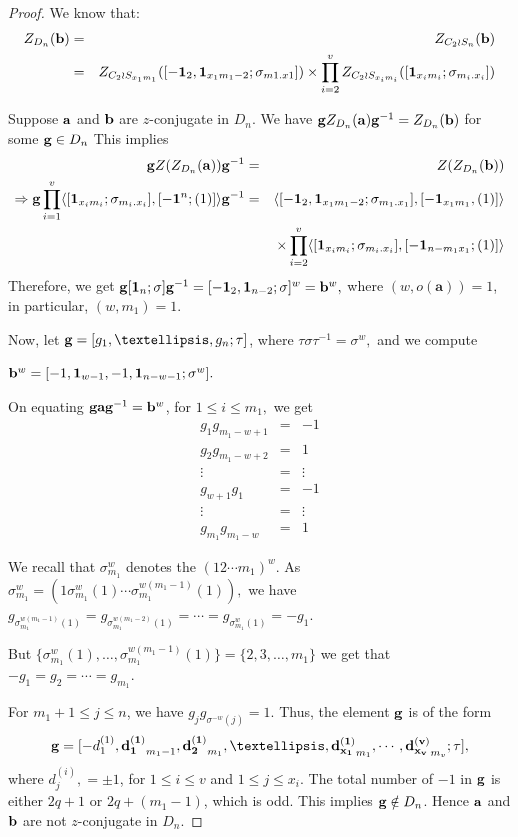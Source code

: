\documentclass[10pt,a4paper]{amsart}
\newcommand{\bmf}[1]{\mathbf{#1}}
\begin{document}
\begin{proof}
We know that: 
\begin{eqnarray*}
 {Z}_{D_n}({\bf b}) &=& {Z}_{C_2 \wr S_n}({\bf b}) \\
&=&{Z}_{C_2\wr S_{x_1m_1}}([{\bf -1}_2,{\bf 1}_{x_1m_1-2}; \sigma_{m1.x1}]) \times \prod_{i = 2}^v {Z}_{C_2 \wr S_{x_im_i}}([{\bf 1}_{x_im_i}; \sigma_{m_i.x_i}])
\end{eqnarray*}

Suppose ${\bf a}$ and ${\bf b}$ are $z$-conjugate in $D_n.$ We have ${\bf g}{Z}_{D_n}({\bf a}){\bf g}^{-1} = {Z}_{D_n}({\bf b})$ for some ${\bf g} \in D_n$
This implies
\begin{eqnarray*}{\bf g}Z({Z}_{D_n}({\bf a})){\bf g}^{-1}& =& Z({Z}_{D_n}({\bf b}))\\
\Rightarrow{\bf g}\prod_{i=1}^v\langle[{\bf 1}_{x_im_i}; \sigma_{m_i.x_i}],[{\bf -1}^n; (1)]\rangle{\bf g}^{-1} &=& \langle[{\bf -1}_2,{\bf 1}_{x_1m_1-2}; \sigma_{m_1.x_1}],[{\bf -1}_{x_1m_1}, (1)]\rangle\\&~& \times \prod_{i=2}^v\langle[{\bf 1}_{x_im_i}; \sigma_{m_i.x_i}],[{\bf -1}_{n-m_1x_1}; (1)]\rangle
\end{eqnarray*}
Therefore, we get ${\bf g}[{\bf 1}_n; \sigma]{\bf g}^{-1} = [{\bf -1}_2, {\bf 1}_{n-2}; \sigma]^w={\bf b}^w,$ where $(w, o(\bmf{a})) = 1$, in particular, $(w, m_1) = 1$. 

Now, let ${\bf g}=[g_1,\ldots,g_n; \tau]$, where $\tau\sigma\tau^{-1} = \sigma^w,$ 
and we compute 

${\bf b}^w = [-1,{\bf 1}_{w-1},-1,{\bf 1}_{n-w-1}; \sigma^w].$

On equating ${\bf gag}^{-1} = {\bf b}^w$, for $1 \leq i \leq m_1,$ we get
\begin{eqnarray*}
g_1g_{m_1 -w +1} &=& -1\\
g_2g_{m_1 -w + 2} &=& 1\\
\vdots &=& \vdots\\
g_{w+1}g_1 &=& -1\\
\vdots &=&\vdots\\
g_{m_1}g_{m_1 -w} &=& 1
\end{eqnarray*}

We recall that $\sigma_{m_1}^w$ denotes the $(12\cdots m_1)^w.$ As $\sigma_{m_1}^w= (1\sigma_{m_1}^w(1) \cdots \sigma_{m_1}^{w(m_1-1)}(1)),$ we have
$g_{\sigma_{m_1}^{w(m_1-1)}(1)} =g_{\sigma_{m_1}^{w(m_1-2)}(1)} = \cdots = g_{\sigma_{m_1}^w(1)} = -g_1$. 

But  $\{\sigma_{m_1}^w(1), \ldots, \sigma_{m_1}^{w(m_1-1)}(1)\} = \{2,3,\ldots, m_1\}$ we get that $-g_1 = g_2 = \cdots = g_{m_1}.$

For $m_1 + 1 \leq j \leq n$, we have $g_{j}g_{\sigma^{-w}(j)} = 1$. Thus, the element ${\bf g}$ is of the form $${\bf g}= [-d^{(1)}_{1},{\bf d^{(1)}_{1}}_{m_1 - 1},{\bf d^{(1)}_2}_{m_1},\ldots,{\bf d^{(1)}_{x_1}}_{m_1},\cdots, {\bf d^{(v)}_{x_v}}_{m_v}; \tau] ,$$ where $d^{(i)}_j,= \pm 1$, for $1 \leq i \leq v$ and $1 \leq j \leq x_i$. The total number of $-1$ in ${\bf g}$ is either $2q + 1$ or $2q + (m_1 -1)$, which is odd. This implies ${\bf g} \notin D_n$. Hence ${\bf a}$ and ${\bf b}$ are  not $z$-conjugate in $D_n.$ 
\end{proof}
\end{document}
